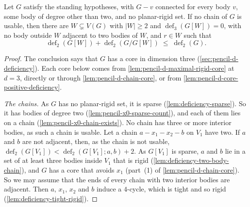 \begin{theorem}
  \label{thm:pencil-x0-theorem-s}
  \leanok
  Let $G$ satisfy the standing hypotheses, with $G - v$ connected for
  every body $v$, some body of degree other than two, and no
  planar-rigid set. If no chain of $G$ is usable, then there are $W
  \subsetneq V(G)$ with $|W| \ge 2$ and $\operatorname{def}_3(G[W]) =
  0$, with no body outside $W$ adjacent to two bodies of $W$, and $r \in
  W$ such that
  \[
    \operatorname{def}_2(G[W]) + \operatorname{def}_2(G/G[W]) \;\le\;
    \operatorname{def}_2(G).
  \]
\end{theorem}
\begin{proof}
  \leanok
  The conclusion says that $G$ has a core in dimension three
  (\cref{sec:pencil-d-deficiency}). Each core below comes from
  \cref{lem:pencil-d-maximal-rigid-core} at $d = 3$, directly or through
  \cref{lem:pencil-d-chain-core}, or from
  \cref{lem:pencil-d-core-positive-deficiency}.

  \emph{The chains.} As $G$ has no planar-rigid set, it is sparse
  (\cref{lem:deficiency-sparse}). So it has bodies of degree two
  (\cref{lem:pencil-x0-sparse-count}), and each of them lies on a chain
  (\cref{lem:pencil-x0-chain-exists}). No chain has three or more
  interior bodies, as such a chain is usable. Let a chain
  $a - x_1 - x_2 - b$ on $V_1$ have two. If $a$ and $b$ are not
  adjacent, then, as the chain is not usable,
  $\operatorname{def}_2(G[V_1]) < \operatorname{def}_2(G[V_1]; a, b) +
  2$. As $G[V_1]$ is sparse, $a$ and $b$ lie in a set of at least three
  bodies inside $V_1$ that is rigid
  (\cref{lem:deficiency-two-body-chain}), and $G$ has a core that avoids
  $x_1$ (part~(1) of \cref{lem:pencil-d-chain-core}). So we may assume that the ends
  of every chain with two interior bodies are adjacent. Then $a$, $x_1$,
  $x_2$ and $b$ induce a $4$-cycle, which is tight and so rigid
  (\cref{lem:deficiency-tight-rigid}).


\end{proof}
